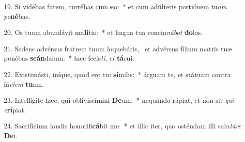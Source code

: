 19. Si vidébas furem, currébas cum \textbf{e}o:~*  et cum adúlteris portiónem tu\textit{am} \textit{po}\textbf{né}bas.\

20. Os tuum abundávit ma\textbf{lí}tia:~*  et lingua tua concin\textit{ná}\textit{bat} \textbf{do}los.\

21. Sedens advérsus fratrem tuum loquebáris, \dag\  et advérsus fílium matris tuæ ponébas \textbf{scán}dalum:~*  hæc fecís\textit{ti}, \textit{et} \textbf{tá}cui.\

22. Existimásti, iníque, quod ero tui \textbf{sí}milis:~*  árguam te, et státuam contra fá\textit{ci}\textit{em} \textbf{tu}am.\

23. Intellígite hæc, qui obliviscímini \textbf{De}um:~*  nequándo rápiat, et non sit \textit{qui} \textit{e}\textbf{rí}piat.\

24. Sacrifícium laudis honorifi\textbf{cá}bit me:~*  et illic iter, quo osténdam illi salu\textit{tá}\textit{re} \textbf{De}i.\


